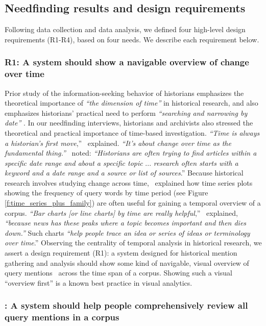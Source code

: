 \subsection{Needfinding results and design requirements}\label{s:needs_results}

Following data collection and data analysis, we defined four high-level design requirements (R1-R4), based on four needs.
We describe each requirement below.

\subsubsection{\textbf{R1: A system should show a navigable overview of change over time}}\label{s:exploration}
Prior study of the information-seeking behavior of historians emphasizes the theoretical importance of \textit{``the dimension of time''} \cite{Case} in historical research, and also emphasizes historians' practical need to perform \textit{``searching and narrowing by date''} \cite{allen}. 
In our needfinding interviews, historians and archivists also stressed the theoretical and practical importance of time-based investigation. \textit{``Time is always a historian's first move},''  \ithree~explained. \textit{``It's about change over time as the fundamental thing.''} \ifive~noted: \textit{``Historians are often trying to find articles within a specific date range and about a specific topic} ... \textit{research often starts with a keyword and a date range and a source or list of sources}.'' 
Because historical research involves studying change across time, \itwo~explained how time series plots showing the frequency of query words by time period (see Figure \ref{f:time_series_plus_family}) are often useful for gaining a temporal overview of a corpus. \textit{``Bar charts [or line charts] by time are really helpful},'' \itwo~explained, \textit{``because news has these peaks where a topic becomes important and then dies down.''} Such charts \textit{``help people trace an idea or series of ideas or terminology over time}.''
Observing the centrality of temporal analysis in historical research, we assert a design requirement (R1): a system designed for historical mention gathering and analysis should show some kind of navigable, visual overview of query mentions \mentions~across the time span of a corpus.
Showing such a visual ``overview first'' \cite{HeerShneiderman, The_Eyes_Have_It} is a known best practice in visual analytics.

\subsubsection{\textbf{\rcomprehensive: A system should help people comprehensively review all query mentions in a corpus}}\label{s:needs_comprehensive}

